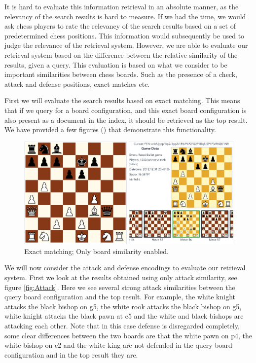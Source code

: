 \documentclass[11pt]{article}
\begin{document}
    It is hard to evaluate this information retrieval in an absolute manner, as the relevancy of the search results is hard to measure. If we had the time, we would ask chess players to rate the relevancy of the search results based on a set of predetermined chess positions. This information would subsequently be used to judge the relevance of the retrieval system. However, we are able to evaluate our retrieval system based on the difference between the relative similarity of the results, given a query. This evaluation is based on what we consider to be important similarities between chess boards. Such as the presence of a check, attack and defense positions, exact matches etc.

    First we will evaluate the search results based on exact matching. This means that if we query for a board configuration, and this exact board configuration is also present as a document in the index, it should be retrieved as the top result. We have provided a few figures () that demonstrate this functionality.

    \begin{figure}[H]
        \centering
        \includegraphics[width=14cm]{images/ExactMatch1-Bo}
        \caption{Exact matching; Only board similarity enabled.}
        \label{fig:ExactMatch1-Bo}
    \end{figure}

    We will now consider the attack and defense encodings to evaluate our retrieval system. First we look at the results obtained using only attack similarity, see figure \ref{fig:Attack}.
    Here we see several strong attack similarities between the query board configuration and the top result. For example, the white knight attacks the black bishop on g5, the white rook attacks the black bishop on g5, white knight attacks the black pawn at e5 and the white and black bishops are attacking each other.
    Note that in this case defense is disregarded completely, some clear differences between the two boards are that the white pawn on p4, the white bishop on c2 and the white king are not defended in the query board configuration and in the top result they are.
\end{document}

